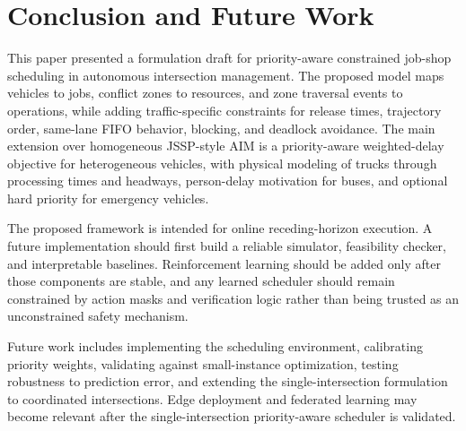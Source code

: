 \section{Conclusion and Future Work}

This paper presented a formulation draft for priority-aware constrained job-shop scheduling in autonomous intersection management. The proposed model maps vehicles to jobs, conflict zones to resources, and zone traversal events to operations, while adding traffic-specific constraints for release times, trajectory order, same-lane FIFO behavior, blocking, and deadlock avoidance. The main extension over homogeneous JSSP-style AIM is a priority-aware weighted-delay objective for heterogeneous vehicles, with physical modeling of trucks through processing times and headways, person-delay motivation for buses, and optional hard priority for emergency vehicles.

The proposed framework is intended for online receding-horizon execution. A future implementation should first build a reliable simulator, feasibility checker, and interpretable baselines. Reinforcement learning should be added only after those components are stable, and any learned scheduler should remain constrained by action masks and verification logic rather than being trusted as an unconstrained safety mechanism.

Future work includes implementing the scheduling environment, calibrating priority weights, validating against small-instance optimization, testing robustness to prediction error, and extending the single-intersection formulation to coordinated intersections. Edge deployment and federated learning may become relevant after the single-intersection priority-aware scheduler is validated.

